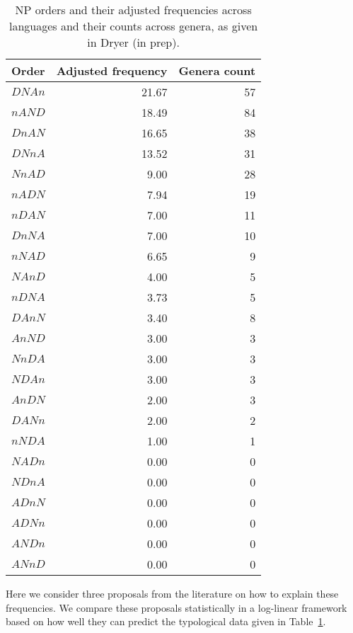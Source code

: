 \documentclass[11pt]{article}
\begin{document}
\begin{table}
  \centering
  \begin{tabular}{|l|r|r|}
    \hline
    Order & Adjusted frequency & Genera count \\
    \hline
    $DNAn$  & 21.67 & 57 \\
    $nAND$  & 18.49 & 84 \\
    $DnAN$  & 16.65 & 38 \\
    $DNnA$  & 13.52 & 31 \\
    $NnAD$  &  9.00 & 28 \\
    $nADN$  &  7.94 & 19 \\
    $nDAN$  &  7.00 & 11 \\
    $DnNA$  &  7.00 & 10 \\
    $nNAD$  &  6.65 &  9 \\
    $NAnD$  &  4.00 &  5 \\
    $nDNA$  &  3.73 &  5 \\
    $DAnN$  &  3.40 &  8 \\
    $AnND$  &  3.00 &  3 \\
    $NnDA$  &  3.00 &  3 \\
    $NDAn$  &  3.00 &  3 \\
    $AnDN$  &  2.00 &  3 \\
    $DANn$  &  2.00 &  2 \\
    $nNDA$  &  1.00 &  1 \\
    $NADn$  &  0.00 &  0 \\
    $NDnA$  &  0.00 &  0 \\
    $ADnN$  &  0.00 &  0 \\
    $ADNn$  &  0.00 &  0 \\
    $ANDn$  &  0.00 &  0 \\
    $ANnD$  &  0.00 &  0 \\
    \hline
  \end{tabular}
  \caption{NP orders and their adjusted frequencies across languages and their counts across genera, as given in Dryer (in prep).}
  \label{tab:order-freqs}
\end{table}

Here we consider three proposals from the literature on how to explain these frequencies.
We compare these proposals statistically in a log-linear framework based on how well they can predict the typological data given in Table~\ref{tab:order-freqs}.
\end{document}
